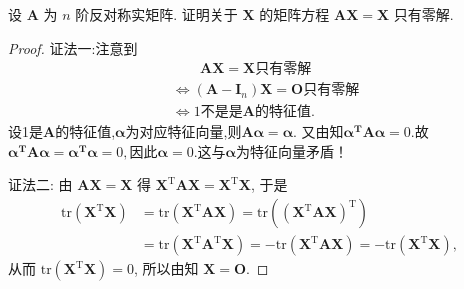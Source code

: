 \documentclass[../../main.tex]{subfiles}
\begin{document}
\begin{example}
设 $\boldsymbol{A}$ 为 $n$ 阶反对称实矩阵. 证明关于 $\boldsymbol{X}$ 的矩阵方程 $\boldsymbol{AX} = \boldsymbol{X}$ 只有零解.
\end{example}
\begin{proof}
{\color{blue}证法一:}注意到
\begin{align*}
&\quad \quad \boldsymbol{AX}=\boldsymbol{X}\text{只有零解}
\\
&\Longleftrightarrow \left( \boldsymbol{A}-\boldsymbol{I}_n \right) \boldsymbol{X}=\boldsymbol{O}\text{只有零解}
\\
&\Longleftrightarrow 1\text{不是是}\boldsymbol{A}\text{的特征值}.
\end{align*}
设1是$\boldsymbol{A}$的特征值,$\boldsymbol{\alpha }$为对应特征向量,则$\boldsymbol{A\alpha }=\boldsymbol{\alpha }$.
又由知$\boldsymbol{\alpha }^{\boldsymbol{T}}\boldsymbol{A\alpha }=0.$故$\boldsymbol{\alpha }^{\boldsymbol{T}}\boldsymbol{A\alpha }=\boldsymbol{\alpha }^{\boldsymbol{T}}\boldsymbol{\alpha }=0,$因此$\boldsymbol{\alpha }=0.$这与$\boldsymbol{\alpha }$为特征向量矛盾！

{\color{blue}证法二:}
由 $\boldsymbol{AX} = \boldsymbol{X}$ 得 $\boldsymbol{X}^\mathrm{T}\boldsymbol{A}\boldsymbol{X} = \boldsymbol{X}^\mathrm{T}\boldsymbol{X}$, 于是
\begin{align*}
\mathrm{tr}\left( \boldsymbol{X}^\mathrm{T}\boldsymbol{X} \right) &= \mathrm{tr}\left( \boldsymbol{X}^\mathrm{T}\boldsymbol{A}\boldsymbol{X} \right) = \mathrm{tr}\left( \left( \boldsymbol{X}^\mathrm{T}\boldsymbol{A}\boldsymbol{X} \right)^\mathrm{T} \right) \\
&= \mathrm{tr}\left( \boldsymbol{X}^\mathrm{T}\boldsymbol{A}^\mathrm{T}\boldsymbol{X} \right) = -\mathrm{tr}\left( \boldsymbol{X}^\mathrm{T}\boldsymbol{A}\boldsymbol{X} \right) = -\mathrm{tr}\left( \boldsymbol{X}^\mathrm{T}\boldsymbol{X} \right),
\end{align*}
从而 $\mathrm{tr}\left( \boldsymbol{X}^\mathrm{T}\boldsymbol{X} \right) = 0$, 所以由知 $\boldsymbol{X} = \boldsymbol{O}$.

\end{proof}
\end{document}
